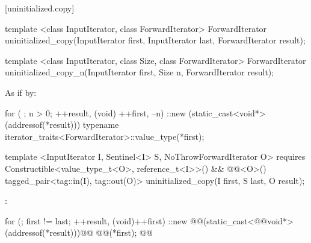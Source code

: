 [uninitialized.copy]{}
{\color{remclr}
\begin{codeblock}
template <class InputIterator, class ForwardIterator>
  ForwardIterator uninitialized_copy(InputIterator first, InputIterator last,
                                     ForwardIterator result);
\end{codeblock}

\setcounter{Paras}{1}
\pnum
\returns {}
\begin{codeblock}
template <class InputIterator, class Size, class ForwardIterator>
  ForwardIterator uninitialized_copy_n(InputIterator first, Size n,
                                       ForwardIterator result);
\end{codeblock}

\pnum
\effects As if by:
\begin{codeblock}
        for ( ; n > 0; ++result, (void) ++first, --n) {
          ::new (static_cast<void*>(addressof(*result)))
            typename iterator_traits<ForwardIterator>::value_type(*first);
        }
\end{codeblock}

\pnum
\returns {}
} %

{\color{addclr}
\begin{codeblock}
template <InputIterator I, Sentinel<I> S, NoThrowForwardIterator O>
  requires Constructible<value_type_t<O>, reference_t<I>>() &&
           @@<O>()
    tagged_pair<tag::in(I), tag::out(O)>
    uninitialized_copy(I first, S last, O result);
\end{codeblock}
} %

\setcounter{Paras}{0}
\pnum
\effects {}:
\begin{codeblock}
        for (; first != last; ++result, (void)++first)
          ::new @@(static_cast<@@void*>(addressof(*result)))@\added{)}@
            @@(*first);
        @@
\end{codeblock}

